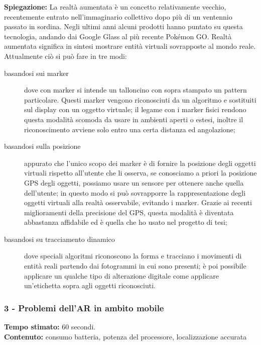 \documentclass[
	twoside]				%
	{toptesi}				%
\begin{document}
	\textbf{Spiegazione:} La realtà aumentata è un concetto relativamente vecchio, recentemente entrato nell'immaginario collettivo dopo più di un ventennio passato in sordina.
	Negli ultimi anni alcuni prodotti hanno puntato su questa tecnologia, andando dai Google Glass al più recente Pokémon GO. Realtà aumentata significa in sintesi mostrare entità virtuali sovrapposte al mondo reale. Attualmente ciò si può fare in tre modi:
	\begin{description}
		\item[basandosi sui marker] dove con marker si intende un talloncino con sopra stampato un pattern particolare. Questi marker vengono riconosciuti da un algoritmo e sostituiti sul display con un oggetto virtuale; il legame con i marker fisici rendono questa modalità scomoda da usare in ambienti aperti o estesi, inoltre il riconoscimento avviene solo entro una certa distanza ed angolazione;
		
		\item[basandosi sulla posizione] appurato che l'unico scopo dei marker è di fornire la posizione degli oggetti virtuali rispetto all'utente che li osserva, se conosciamo a priori la posizione GPS degli oggetti, possiamo usare un sensore per ottenere anche quella dell'utente; in questo modo si può sovrapporre la rappresentazione degli oggetti virtuali alla realtà osservabile, evitando i marker.
		Grazie ai recenti miglioramenti della precisione del GPS, questa modalità è diventata abbastanza affidabile ed è quella che ho usato nel progetto di tesi;
		
		\item[basandosi su tracciamento dinamico] dove speciali algoritmi riconoscono la forma e tracciano i movimenti di entità reali partendo dai fotogrammi in cui sono presenti; è poi possibile applicare un qualche tipo di alterazione digitale come applicare un'etichetta sopra agli oggetti riconosciuti.
	\end{description}
	
	\subsubsection{3 - Problemi dell'AR in ambito mobile}
	
	\textbf{Tempo stimato:} 60 secondi. \\
	
	\textbf{Contenuto:} consumo batteria, potenza del processore, localizzazione accurata \\
	
\end{document}
